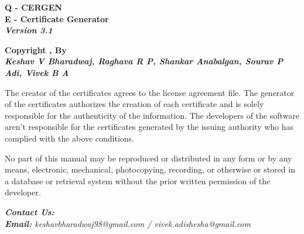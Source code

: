 

\begin{titlingpage}
	
\vspace{2cm}

\centering
{
	\Large{
		\textbf{Q - CERGEN}\\
		\textbf{E - Certificate Generator}\\
		\textbf{\textit{Version 3.1}}}
	\vspace{2cm}
	
	\Large\textbf{Copyright ,  By}\\
	\vspace{0.5cm}
	\large\textbf{\textit{Keshav V Bharadwaj, Raghava R P, Shankar Anabalgan, Sourav P Adi, Vivek B A}}
	\vspace{2.5cm}
}


The creator of the certificates agrees to the license agreement file. The generator of the certificates authorizes the creation of each certificate and is solely responsible for the authenticity of the information. The developers of the software aren't responsible for the certificates generated by the issuing authority who has complied with the above conditions.

\vspace{2cm}

No part of this manual may be reproduced or distributed in any form or by any means, electronic, mechanical, photocopying, recording, or otherwise or stored in a database or retrieval system without the prior written permission of the developer.

\vspace{0.5cm}

\begin{flushleft}
	\large\textit{\textbf{Contact Us:}}\\
	\textit{\textbf{Email:} keshavbharadwaj98@gmail.com / vivek.adishesha@gmail.com}\\
\end{flushleft}
	
	
	
	
\end{titlingpage}


